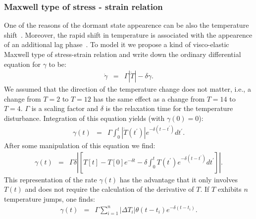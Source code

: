 \documentclass[10pt,A4paper]{article}
\begin{document}
\subsubsection{Maxwell type of stress - strain relation}
One of the reasons of the dormant state appearence can be also the temperature shift~\cite{oliver_viable_1995}.
Moreover, the rapid shift in temperature is associated with the appearence of an additional lag phase~\cite{zwietering_modeling_1994}.
To model it we propose a kind of visco-elastic Maxwell type of stress-strain relation and write down the ordinary differential equation for $\gamma$ to be:
\begin{eqnarray}
    \dot{\gamma} &=& \Gamma \left |\dot{T}\right |-\delta \gamma.
\end{eqnarray}
We assumed that the direction of the temperature change does not matter, i.e., a change from $T=2$ to $T=12$ has the same effect as a change from $T=14$ to $T=4$. 
$\Gamma$ is a scaling factor and $\delta$ is the relaxation time for the temperature disturbance. 
Integration of this equation yields (with $\gamma(0)=0$):
\begin{eqnarray}
    \gamma(t) &=& \Gamma \int_0^t \left |\dot{T}(t^{\prime})\right |e^{-\delta (t-t^{\prime})}dt^{\prime}.
\end{eqnarray}
After some manipulation of this equation we find:
\begin{eqnarray}
    \gamma(t) &=& \Gamma\delta\left |\left[T[t]-T[0]e^{-\delta t}-\delta \int_0^t T(t^{\prime})e^{-\delta (t-t^{\prime})}dt^{\prime}\right]\right |.
\end{eqnarray}
This representation of the rate $\gamma(t)$ has the advantage that it only involves $T(t)$ and does not require the calculation of the derivative of $T$. 
If $T$ exhibits $n$ temperature jumps, one finds:
\begin{eqnarray}
    \gamma(t) &=& \Gamma\sum_{i=1}^n \left |\Delta T_i \right |\theta(t-t_i)e^{-\delta(t-t_i)}.
    \label{eq:gamma_tempshift}
\end{eqnarray}
\end{document}
